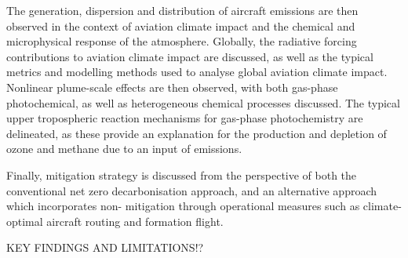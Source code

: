 The generation, dispersion and distribution of aircraft emissions are then observed in the context of aviation climate impact and the chemical and microphysical response of the atmosphere. Globally, the radiative forcing contributions to aviation climate impact are discussed, as well as the typical metrics and modelling methods used to analyse global aviation climate impact. Nonlinear plume-scale effects are then observed, with both gas-phase photochemical, as well as heterogeneous chemical processes discussed. The typical upper tropospheric reaction mechanisms for gas-phase photochemistry are delineated, as these provide an explanation for the production and depletion of ozone and methane due to an input of  emissions.

Finally, mitigation strategy is discussed from the perspective of both the conventional net zero decarbonisation approach, and an alternative approach which incorporates non- mitigation through operational measures such as climate-optimal aircraft routing and formation flight. 

KEY FINDINGS AND LIMITATIONS!?




